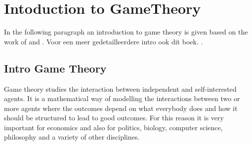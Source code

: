 \chapter{Intoduction to GameTheory}
\label{cha:1}
%


In the following paragraph an introduction to game theory is given based on the work of  and . Voor een meer gedetailleerdere intro ook dit boek. .
\section{Intro Game Theory}
\label{Cha:1:Intro.Game.Theory}

Game theory studies the interaction between independent and self-interested agents. It is a mathematical way of modelling the interactions between two or more agents where the outcomes depend on what everybody does and how it should be structured to lead to good outcomes. For this reason it is very important for economics and also for politics, biology, computer science, philosophy and a variety of other disciplines.  \\

